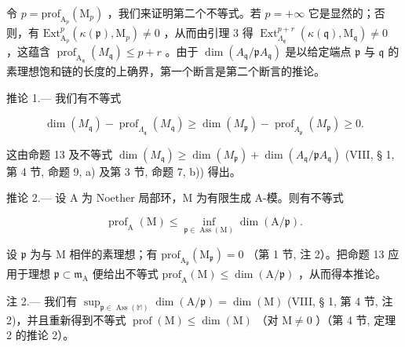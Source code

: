 令 \(p = \text{prof}_{\text{A}_p}(\text{M}_p)\) ，我们来证明第二个不等式。若 \(p = +\infty\) 它是显然的；否则，有 \(\text{Ext}_{\text{A}_p}^p(\kappa(\mathfrak{p}), \text{M}_p) \neq 0\) ，从而由引理 3 得 \(\operatorname{Ext}_{\Lambda_{\mathfrak{q}}}^{p+r}(\kappa(\mathfrak{q}),\mathrm{M}_{\mathfrak{q}})\neq0\) ，这蕴含 \(\operatorname{prof}_{\mathrm{A}_{\mathfrak{q}}}(M_{\mathfrak{q}})\leqslant p+r\) 。由于 \(\dim(A_{\mathfrak{q}}/\mathfrak{p}A_{\mathfrak{q}})\) 是以给定端点 \(\mathfrak{p}\) 与 \(\mathfrak{q}\) 的素理想饱和链的长度的上确界，第一个断言是第二个断言的推论。

推论 1.--- 我们有不等式

\[
\dim (M _ {\mathfrak {q}}) - \operatorname{prof} _ {\Lambda_ {\mathfrak {q}}} (M _ {\mathfrak {q}}) \geqslant \dim (M _ {\mathfrak {p}}) - \operatorname{prof} _ {A _ {\mathfrak {p}}} (M _ {\mathfrak {p}}) \geqslant 0.
\]

这由命题 13 及不等式 \(\dim(M_{\mathfrak{q}}) \geqslant \dim(M_{\mathfrak{p}}) + \dim(A_{\mathfrak{q}} / \mathfrak{p}A_{\mathfrak{q}})\) (VIII, § 1, 第 4 节, 命题 9, a) 及第 3 节, 命题 7, b)) 得出。

推论 2.--- 设 A 为 Noether 局部环，M 为有限生成 A-模。则有不等式

\[
\operatorname{prof} _ {\mathrm{A}} (\mathrm{M}) \leqslant \inf _ {\mathfrak {p} \in \operatorname{Ass} (\mathrm{M})} \dim (\mathrm{A} / \mathfrak {p}).
\]

设 \(\mathfrak{p}\) 为与 M 相伴的素理想；有 \(\mathrm{prof}_{\mathrm{A}_{\mathfrak{p}}}(\mathrm{M}_{\mathfrak{p}})=0\) （第 1 节, 注 2）。把命题 13 应用于理想 \(\mathfrak{p}\subset\mathfrak{m}_{\mathrm{A}}\) 便给出不等式 \(\mathrm{prof}_{\mathrm{A}}(\mathrm{M})\leqslant\dim(\mathrm{A}/\mathfrak{p})\) ，从而得本推论。

注 2.--- 我们有 \(\sup_{\mathfrak{p}\in\operatorname{Ass}(\mathbb{M})}\dim(\mathrm{A}/\mathfrak{p})=\dim(\mathrm{M})\) (VIII, § 1, 第 4 节, 注 2)，并且重新得到不等式 \(\operatorname{prof}(\mathrm{M})\leqslant\dim(\mathrm{M})\) （对 \(\mathrm{M}\neq0\) ）（第 4 节, 定理 2 的推论 2）。

